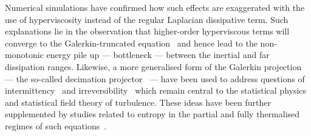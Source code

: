 \documentclass[../Rajarshi-thesis-draft.tex]{subfiles}
\begin{document}
Numerical simulations have confirmed how such effects are exaggerated with the use of hyperviscosity \cite{FrischetalBottleneck2008,BanerjeeRayHyperviscosity2014}
instead of the regular Laplacian
dissipative term.  Such explanations lie in the observation that
higher-order hyperviscous terms will converge to the Galerkin-truncated
equation~\cite{FrischetalBottleneck2008,BanerjeeRayHyperviscosity2014} and hence lead to the non-monotonic
energy pile up --- bottleneck --- between the inertial and far dissipation ranges.
Likewise, a more generalised form of the Galerkin projection --- the so-called
decimation projector~\cite{FrischetalDecimation2012} --- have been used to
address questions of
intermittency~\cite{Lanotte2015,Buzzicottietal2016Burgers,Buzzicotti2016NS} and
irreversibility~\cite{Ray2018,Picardoetal2020} which remain central to the
statistical physics and statistical field theory of turbulence. These ideas have been further
supplemented by studies related to entropy in the partial and fully thermalised
regimes of such equations~\cite{MKV2024}.
\end{document}
